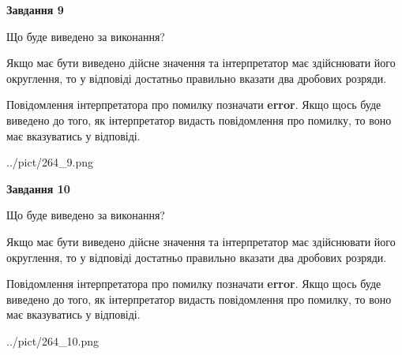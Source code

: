 \documentclass[12pt, ukrainian]{article}
\begin{document}
{\begin {Large}
{\begin {center}\textbf{Завдання 9}\end {center}}\par
Що буде виведено за виконання? \par

Якщо має бути виведено дійсне значення та інтерпретатор має здійснювати його округлення, 
то у відповіді достатньо правильно вказати два дробових розряди.

Повідомлення інтерпретатора про помилку позначати \textbf{error}.
Якщо щось буде виведено до того, як інтерпретатор видасть повідомлення про помилку, 
то воно має вказуватись у відповіді. \par

\begin{center}
	{../pict/264_9.png}
\end{center}
\newpage

{\begin {center}\textbf{Завдання 10}\end {center}}\par
Що буде виведено за виконання? \par

Якщо має бути виведено дійсне значення та інтерпретатор має здійснювати його округлення, 
то у відповіді достатньо правильно вказати два дробових розряди.

Повідомлення інтерпретатора про помилку позначати \textbf{error}.
Якщо щось буде виведено до того, як інтерпретатор видасть повідомлення про помилку, 
то воно має вказуватись у відповіді. \par

\begin{center}
	{../pict/264_10.png}
\end{center}
\newpage

\end {Large}}
\end{document}
